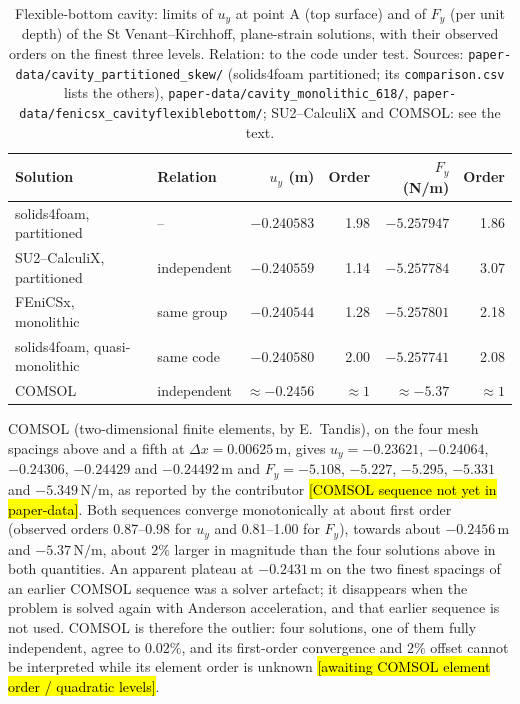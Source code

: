 \begin{table}[htbp]
	\centering
	\small
	\setlength{\tabcolsep}{4pt}
	\caption{Flexible-bottom cavity: limits of $u_y$ at point A (top surface) and of $F_y$ (per unit depth) of the St Venant--Kirchhoff, plane-strain solutions, with their observed orders on the finest three levels. Relation: to the code under test. Sources: \texttt{paper-data/cavity\_partitioned\_skew/} (solids4foam partitioned; its \texttt{comparison.csv} lists the others), \texttt{paper-data/cavity\_monolithic\_618/}, \texttt{paper-data/fenicsx\_cavityflexiblebottom/}; SU2--CalculiX and COMSOL: see the text.}
	\label{tab:cavity_refs}
	\begin{tabular}{llrrrr}
		\toprule
		Solution & Relation & $u_y$ (m) & Order & $F_y$ (N/m) & Order \\
		\midrule
		solids4foam, partitioned & -- & $-0.240583$ & 1.98 & $-5.257947$ & 1.86 \\
		SU2--CalculiX, partitioned & independent & $-0.240559$ & 1.14 & $-5.257784$ & 3.07 \\
		FEniCSx, monolithic & same group & $-0.240544$ & 1.28 & $-5.257801$ & 2.18 \\
		solids4foam, quasi-monolithic & same code & $-0.240580$ & 2.00 & $-5.257741$ & 2.08 \\
		COMSOL & independent & $\approx-0.2456$ & $\approx1$ & $\approx-5.37$ & $\approx1$ \\
		\bottomrule
	\end{tabular}
\end{table}

COMSOL (two-dimensional finite elements, by E.~Tandis), on the four mesh spacings above and a fifth at $\Delta x = 0.00625\,\mathrm{m}$, gives $u_y = -0.23621$, $-0.24064$, $-0.24306$, $-0.24429$ and $-0.24492\,\mathrm{m}$ and $F_y = -5.108$, $-5.227$, $-5.295$, $-5.331$ and $-5.349\,\mathrm{N/m}$, as reported by the contributor \hl{[COMSOL sequence not yet in paper-data]}.
Both sequences converge monotonically at about first order (observed orders 0.87--0.98 for $u_y$ and 0.81--1.00 for $F_y$), towards about $-0.2456\,\mathrm{m}$ and $-5.37\,\mathrm{N/m}$, about $2\%$ larger in magnitude than the four solutions above in both quantities.
An apparent plateau at $-0.2431\,\mathrm{m}$ on the two finest spacings of an earlier COMSOL sequence was a solver artefact; it disappears when the problem is solved again with Anderson acceleration, and that earlier sequence is not used.
COMSOL is therefore the outlier: four solutions, one of them fully independent, agree to $0.02\%$, and its first-order convergence and $2\%$ offset cannot be interpreted while its element order is unknown \hl{[awaiting COMSOL element order / quadratic levels]}.

